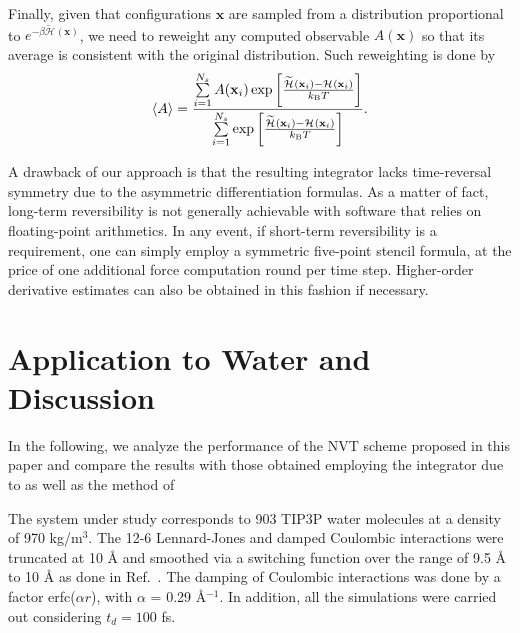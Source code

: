 \documentclass[
journal=jctcce,
layout=twocolumn
]{achemso}
\newcommand{\vt}[1]{\boldsymbol{\mathbf{#1}}}   %
\newcommand{\Ham}[1]{{\mathcal H}_\text{#1}}    %
\newcommand{\refined}[1]{\widetilde{#1}}
\begin{document}
Finally, given that configurations $\vt x$ are sampled from a distribution proportional to $e^{-\beta \refined{\Ham{}}(\vt x)}$, we need to reweight any computed observable $A(\vt x)$ so that its average is consistent with the original distribution.
Such reweighting is done by \cite{Torrie_1977}
\begin{equation}
\label{eq:reweighting}
\langle A \rangle = \frac{\sum\limits_{i=1}^{N_s} A(\vt x_i) \exp \left[{\frac{\refined{\Ham{}}(\vt x_i) - {\Ham{}}(\vt x_i)}{k_\text{\tiny B} T}}\right]}{\sum\limits_{i=1}^{N_s} \exp \left[{\frac{\refined{\Ham{}}(\vt x_i) - {\Ham{}}(\vt x_i)}{k_\text{\tiny B} T}}\right] }.
\end{equation}

A drawback of our approach is that the resulting integrator lacks time-reversal symmetry due to the asymmetric differentiation formulas.
As a matter of fact, long-term reversibility is not generally achievable with software that relies on floating-point arithmetics.
In any event, if short-term reversibility is a requirement, one can simply employ a symmetric five-point stencil formula, at the price of one additional force computation round per time step.
Higher-order derivative estimates can also be obtained in this fashion if necessary.

\section{Application to Water and Discussion}
\label{sec:numerical_results}

In the following, we analyze the performance of the NVT scheme proposed in  this paper and compare the results with those obtained employing the integrator due to \citeauthor{Martyna_1996} \cite{Martyna_1996} as well as the method of \citeauthor{Kamberaj_2005} \cite{Kamberaj_2005}

The system under study corresponds to 903 TIP3P\cite{Jorgensen_1983} water molecules at a density of 970 kg/m$^3$.
The 12-6 Lennard-Jones and damped Coulombic interactions were truncated at  10 {\AA} and smoothed via a switching function over the range of 9.5 {\AA} to  10 {\AA} as done in Ref.~. 
The damping of Coulombic interactions was done by a factor erfc($\alpha r$), with $\alpha$ = 0.29 {\AA}$^{-1}$.
In addition, all the simulations were carried out considering $t_d = 100$ fs.
\end{document}
